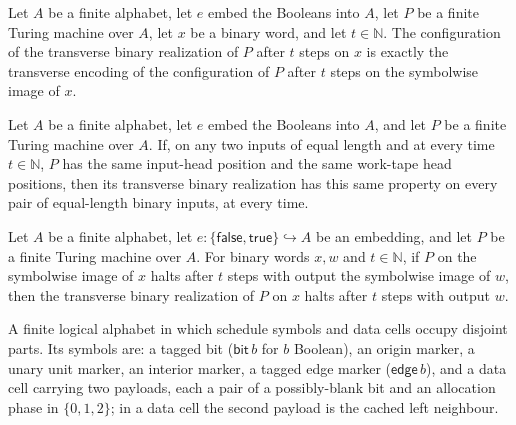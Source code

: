 \begin{lemma}
\label{Complexity.parallelTM_run}
\leanok
{}
Let $A$ be a finite alphabet, let $e$ embed the Booleans into $A$, let $P$ be a finite
Turing machine over $A$, let $x$ be a binary word, and let $t\in\mathbb N$. The
configuration of the transverse binary realization of $P$ after $t$ steps on $x$ is
exactly the transverse encoding of the configuration of $P$ after $t$ steps on the
symbolwise image of $x$.
\end{lemma}

\begin{lemma}
\label{Complexity.parallelTM_oblivious}
\leanok
{}
Let $A$ be a finite alphabet, let $e$ embed the Booleans into $A$, and let $P$ be a
finite Turing machine over $A$. If, on any two inputs of equal length and at every time
$t\in\mathbb N$, $P$ has the same input-head position and the same work-tape head
positions, then its transverse binary realization has this same property on every pair
of equal-length binary inputs, at every time.
\end{lemma}

\begin{lemma}
\label{Complexity.parallelTM_computes}
\leanok
{}
Let $A$ be a finite alphabet, let $e:\{\mathsf{false},\mathsf{true}\}\hookrightarrow A$
be an embedding, and let $P$ be a finite Turing machine over $A$. For binary words $x,w$
and $t\in\mathbb N$, if $P$ on the symbolwise image of $x$ halts after $t$ steps with
output the symbolwise image of $w$, then the transverse binary realization of $P$ on $x$
halts after $t$ steps with output $w$.
\end{lemma}

\begin{definition}
\label{Complexity.OblSymbol}
\leanok
A finite logical alphabet in which schedule symbols and data cells occupy disjoint
parts. Its symbols are: a tagged bit ($\mathsf{bit}\,b$ for $b$ Boolean), an origin
marker, a unary unit marker, an interior marker, a tagged edge marker
($\mathsf{edge}\,b$), and a data cell carrying two payloads, each a pair of a
possibly-blank bit and an allocation phase in $\{0, 1, 2\}$; in a data cell the
second payload is the cached left neighbour.
\end{definition}


